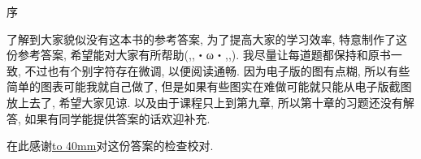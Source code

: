 \clearpage
\hideheaderfooter

\vspace*{-5mm} 
\begin{center}
    \large \heiti 序
\end{center}







了解到大家貌似没有这本书的参考答案, 为了提高大家的学习效率, 特意制作了这份参考答案, 希望能对大家有所帮助(,,・ω・,,). 我尽量让每道题都保持和原书一致, 不过也有个别字符存在微调, 以便阅读通畅. 因为电子版的图有点糊, 所以有些简单的图表可能我就自己做了, 但是如果有些图实在难做可能就只能从电子版截图放上去了, 希望大家见谅. 以及由于课程只上到第九章, 所以第十章的习题还没有解答, 如果有同学能提供答案的话欢迎补充.

在此感谢\underline{\hbox to 40mm{}}对这份答案的检查校对.

